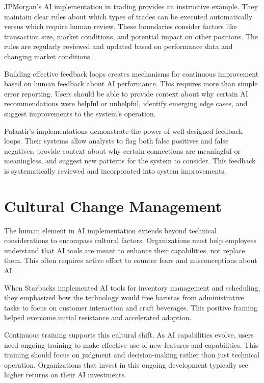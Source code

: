 \documentclass[
  Letterpaper,
]{scrbook}
\begin{document}
JPMorgan's AI implementation in trading provides an instructive example.
They maintain clear rules about which types of trades can be executed
automatically versus which require human review. These boundaries
consider factors like transaction size, market conditions, and potential
impact on other positions. The rules are regularly reviewed and updated
based on performance data and changing market conditions.

Building effective feedback loops creates mechanisms for continuous
improvement based on human feedback about AI performance. This requires
more than simple error reporting. Users should be able to provide
context about why certain AI recommendations were helpful or unhelpful,
identify emerging edge cases, and suggest improvements to the system's
operation.

Palantir's implementations demonstrate the power of well-designed
feedback loops. Their systems allow analysts to flag both false
positives and false negatives, provide context about why certain
connections are meaningful or meaningless, and suggest new patterns for
the system to consider. This feedback is systematically reviewed and
incorporated into system improvements.

\section{Cultural Change Management}\label{cultural-change-management}

The human element in AI implementation extends beyond technical
considerations to encompass cultural factors. Organizations must help
employees understand that AI tools are meant to enhance their
capabilities, not replace them. This often requires active effort to
counter fears and misconceptions about AI.

When Starbucks implemented AI tools for inventory management and
scheduling, they emphasized how the technology would free baristas from
administrative tasks to focus on customer interaction and craft
beverages. This positive framing helped overcome initial resistance and
accelerated adoption.

Continuous training supports this cultural shift. As AI capabilities
evolve, users need ongoing training to make effective use of new
features and capabilities. This training should focus on judgment and
decision-making rather than just technical operation. Organizations that
invest in this ongoing development typically see higher returns on their
AI investments.
\end{document}
